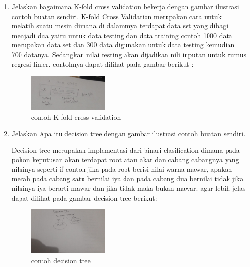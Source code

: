 \begin{enumerate}
\begin{figure}[H]
\end{figure}

\item Jelaskan bagaimana K-fold cross validation bekerja dengan gambar ilustrasi contoh buatan sendiri.
K-fold Cross Validation merupakan cara untuk melatih suatu mesin dimana di dalammya terdapat data set yang dibagi menjadi dua yaitu untuk data testing dan data training contoh 1000 data merupakan data set dan 300 data digunakan untuk data testing kemudian 700 datanya. Sedangkan nilai testing akan dijadikan nili inputan untuk rumus regresi linier. contohnya dapat dilihat pada gambar berikut :
\begin{figure}[H]
\centering
\includegraphics[width= 4cm]{figures/1174039/chapter2/7.jpeg}
\caption{contoh K-fold cross validation}

\end{figure}

\item Jelaskan Apa itu decision tree dengan gambar ilustrasi contoh buatan sendiri.\par
Decision tree merupakan implementasi dari binari clasification dimana pada pohon keputusan akan terdapat root atau akar dan cabang cabangnya yang nilainya seperti if contoh jika pada root berisi nilai warna mawar, apakah merah pada cabang satu bernilai iya dan pada cabang dua bernilai tidak jika nilainya iya berarti mawar dan jika tidak maka bukan mawar.
agar lebih jelas dapat dilihat pada gambar decision tree berikut:
\begin{figure}[H]
\centering
\includegraphics[width= 4cm]{figures/1174039/chapter2/8.jpeg}
\caption{contoh decision tree}

\end{figure}


\end{enumerate}
